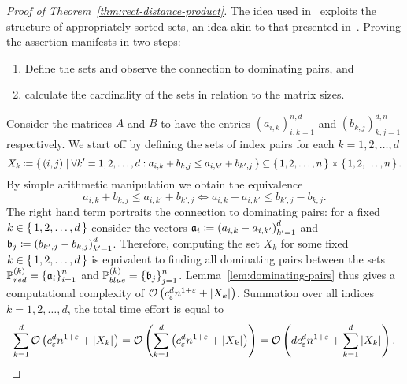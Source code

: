 \begin{proof}[Proof of Theorem~\ref{thm:rect-distance-product}]
    The idea used in~\cite{Chan2007} exploits the structure of appropriately sorted sets, an idea akin to that presented in~\cite{Dobosiewicz2007}.
    Proving the assertion manifests in two steps:
    \begin{enumerate}
        \item Define the sets and observe the connection to dominating pairs, and
        \item calculate the cardinality of the sets in relation to the matrix sizes.
    \end{enumerate}

    Consider the matrices $A$ and $B$ to have the entries ${(a_{i, k})}_{i, k = 1}^{n, d}$ and ${(b_{k, j})}_{k, j = 1}^{d, n}$ respectively.
    We start off by defining the sets of index pairs for each $k = 1, 2, \dots, d$
    \[
        X_k \coloneqq \left\{\,(i, j)\mid\forall k' = 1, 2, \dots, d: a_{i, k} + b_{k, j} \leq a_{i, k'} + b_{k', j}\,\right\} \subseteq \left\{\,1, 2, \dots, n\,\right\} \times \left\{\,1, 2, \dots, n\,\right\}.
    \]
    By simple arithmetic manipulation we obtain the equivalence
    \begin{equation}\label{eq:dominating-pair-inequality}
        a_{i, k} + b_{k, j} \leq a_{i, k'} + b_{k', j} \iff a_{i, k} - a_{i, k'} \leq b_{k', j} - b_{k, j}.
    \end{equation}
    The right hand term portraits the connection to dominating pairs: for a fixed $k \in \left\{\,1, 2, \dots, d\,\right\}$ consider the vectors $\mathfrak{a}_i \coloneqq {(a_{i, k} - a_{i, k'})}_{k' = 1}^d$ and $\mathfrak{b}_j \coloneqq {(b_{k', j} - b_{k, j})}_{k' = 1}^d$.
    Therefore, computing the set $X_k$ for some fixed $k \in \left\{\,1, 2, \dots, d\,\right\}$ is equivalent to finding all dominating pairs between the sets $\mathbb{P}_{red}^{(k)} = {\{ \mathfrak{a}_i \}}_{i = 1}^n$ and $\mathbb{P}_{blue}^{(k)} = {\{ \mathfrak{b}_j \}}_{j = 1}^n$.
    Lemma~\ref{lem:dominating-pairs} thus gives a computational complexity of $\mathcal{O}\left( c_\varepsilon^d n^{1 + \varepsilon} + \left\lvert X_k\right\rvert_{} \right)$.
    Summation over all indices $k = 1, 2, \dots, d$, the total time effort is equal to
    \[
        \sum\limits_{k = 1}^d \mathcal{O}\left( c_\varepsilon^d n^{1 + \varepsilon} + \left\lvert X_k\right\rvert_{} \right) = \mathcal{O}\left( \sum\limits_{k = 1}^d \left( c_\varepsilon^d n^{1 + \varepsilon} + \left\lvert X_k\right\rvert_{} \right) \right) = \mathcal{O}\left( d c_\varepsilon^d n^{1 + \varepsilon} + \sum\limits_{k = 1}^d \left\lvert X_k\right\rvert_{} \right).
    \]


\end{proof}
